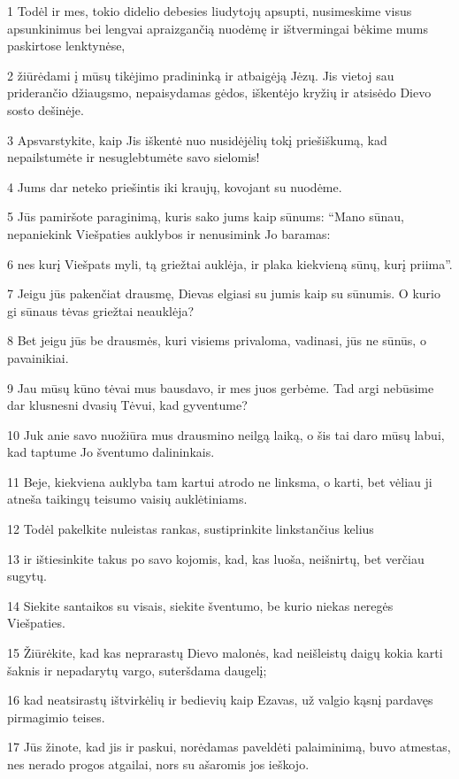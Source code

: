 \par 1 Todėl ir mes, tokio didelio debesies liudytojų apsupti, nusimeskime visus apsunkinimus bei lengvai apraizgančią nuodėmę ir ištvermingai bėkime mums paskirtose lenktynėse, 
\par 2 žiūrėdami į mūsų tikėjimo pradininką ir atbaigėją Jėzų. Jis vietoj sau priderančio džiaugsmo, nepaisydamas gėdos, iškentėjo kryžių ir atsisėdo Dievo sosto dešinėje. 
\par 3 Apsvarstykite, kaip Jis iškentė nuo nusidėjėlių tokį priešiškumą, kad nepailstumėte ir nesuglebtumėte savo sielomis! 
\par 4 Jums dar neteko priešintis iki kraujų, kovojant su nuodėme. 
\par 5 Jūs pamiršote paraginimą, kuris sako jums kaip sūnums: “Mano sūnau, nepaniekink Viešpaties auklybos ir nenusimink Jo baramas: 
\par 6 nes kurį Viešpats myli, tą griežtai auklėja, ir plaka kiekvieną sūnų, kurį priima”. 
\par 7 Jeigu jūs pakenčiat drausmę, Dievas elgiasi su jumis kaip su sūnumis. O kurio gi sūnaus tėvas griežtai neauklėja? 
\par 8 Bet jeigu jūs be drausmės, kuri visiems privaloma, vadinasi, jūs ne sūnūs, o pavainikiai. 
\par 9 Jau mūsų kūno tėvai mus bausdavo, ir mes juos gerbėme. Tad argi nebūsime dar klusnesni dvasių Tėvui, kad gyventume? 
\par 10 Juk anie savo nuožiūra mus drausmino neilgą laiką, o šis tai daro mūsų labui, kad taptume Jo šventumo dalininkais. 
\par 11 Beje, kiekviena auklyba tam kartui atrodo ne linksma, o karti, bet vėliau ji atneša taikingų teisumo vaisių auklėtiniams. 
\par 12 Todėl pakelkite nuleistas rankas, sustiprinkite linkstančius kelius 
\par 13 ir ištiesinkite takus po savo kojomis, kad, kas luoša, neišnirtų, bet verčiau sugytų. 
\par 14 Siekite santaikos su visais, siekite šventumo, be kurio niekas neregės Viešpaties. 
\par 15 Žiūrėkite, kad kas neprarastų Dievo malonės, kad neišleistų daigų kokia karti šaknis ir nepadarytų vargo, suteršdama daugelį; 
\par 16 kad neatsirastų ištvirkėlių ir bedievių kaip Ezavas, už valgio kąsnį pardavęs pirmagimio teises. 
\par 17 Jūs žinote, kad jis ir paskui, norėdamas paveldėti palaiminimą, buvo atmestas, nes nerado progos atgailai, nors su ašaromis jos ieškojo. 
